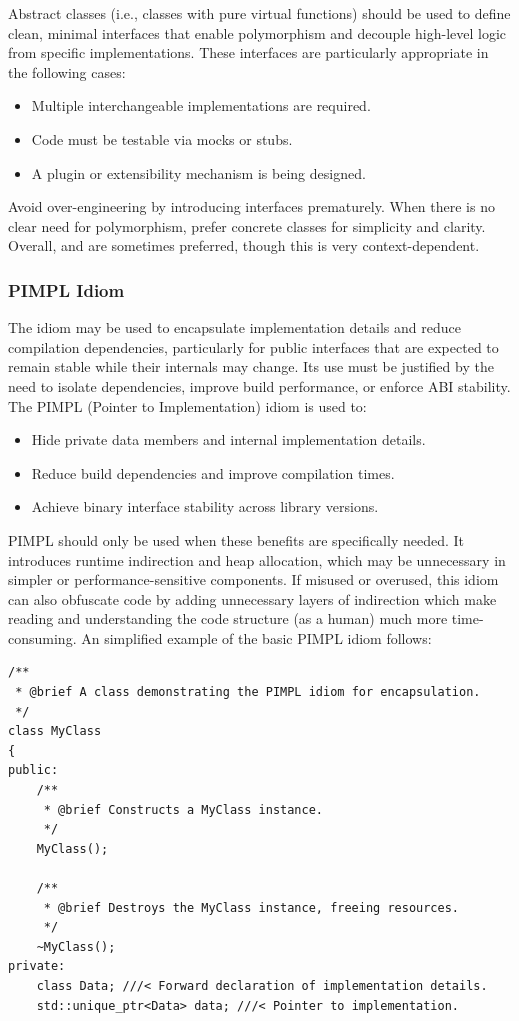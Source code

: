 Abstract classes (i.e., classes with pure virtual functions) should be used to define clean, minimal interfaces that enable polymorphism and decouple high-level logic from specific implementations. These interfaces are particularly appropriate in the following cases:
\begin{itemize}\itemsep0em
    \item Multiple interchangeable implementations are required.
    \item Code must be testable via mocks or stubs.
    \item A plugin or extensibility mechanism is being designed.
\end{itemize}
Avoid over-engineering by introducing interfaces prematurely. When there is no clear need for polymorphism, prefer concrete classes for simplicity and clarity. Overall,  and  are sometimes preferred, though this is very context-dependent.





\subsubsection*{PIMPL Idiom}

The  idiom may be used to encapsulate implementation details and reduce compilation dependencies, particularly for public interfaces that are expected to remain stable while their internals may change. Its use must be justified by the need to isolate dependencies, improve build performance, or enforce ABI stability. The PIMPL (Pointer to Implementation) idiom is used to:
\begin{itemize}\itemsep0em
    \item Hide private data members and internal implementation details.
    \item Reduce build dependencies and improve compilation times.
    \item Achieve binary interface stability across library versions.
\end{itemize}

PIMPL should only be used when these benefits are specifically needed. It introduces runtime indirection and heap allocation, which may be unnecessary in simpler or performance-sensitive components. If misused or overused, this idiom can also obfuscate code by adding unnecessary layers of indirection which make reading and understanding the code structure (as a human) much more time-consuming. An simplified example of the basic PIMPL idiom follows:
\begin{lstlisting}[style=cppstyle]
/**
 * @brief A class demonstrating the PIMPL idiom for encapsulation.
 */
class MyClass 
{
public:
    /**
     * @brief Constructs a MyClass instance.
     */
    MyClass();

    /**
     * @brief Destroys the MyClass instance, freeing resources.
     */
    ~MyClass();
private:
    class Data; ///< Forward declaration of implementation details.
    std::unique_ptr<Data> data; ///< Pointer to implementation.
\end{lstlisting}

